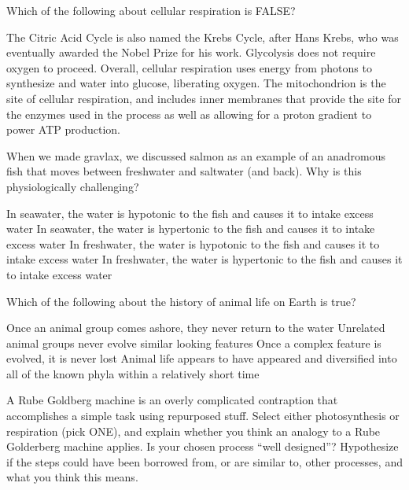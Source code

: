 \documentclass[exam,addpoints,answers]{exam}
\begin{document}
\begin{questions}
\question[1] Which of the following about cellular respiration is FALSE? 
\begin{choices}
\choice The Citric Acid Cycle is also named the Krebs Cycle, after Hans Krebs, who was eventually awarded the Nobel Prize for his work. 
\choice Glycolysis does not require oxygen to proceed. 
\CorrectChoice Overall, cellular respiration uses energy from photons to synthesize  and water into glucose, liberating oxygen. 
\choice The mitochondrion is the site of cellular respiration, and includes inner membranes that provide the site for the enzymes used in the process as well as allowing for a proton gradient to power ATP production. 
\end{choices}




\question[1] When we made gravlax, we discussed salmon as an example of an anadromous fish that moves between freshwater and saltwater (and back). Why is this physiologically challenging? 
\begin{choices}
\choice In seawater, the water is hypotonic to the fish and causes it to intake excess water
\choice In seawater, the water is hypertonic to the fish and causes it to intake excess water
\CorrectChoice In freshwater, the water is hypotonic to the fish and causes it to intake excess water
\choice In freshwater, the water is hypertonic to the fish and causes it to intake excess water
\end{choices}




\question[1] Which of the following about the history of animal life on Earth is true? 
\begin{choices}
\choice Once an animal group comes ashore, they never return to the water
\choice Unrelated animal groups never evolve similar looking features
\choice Once a complex feature is evolved, it is never lost
\CorrectChoice Animal life appears to have appeared and diversified into all of the known phyla within a relatively short time
\end{choices}



\clearpage
\question[22] A Rube Goldberg machine is an overly complicated contraption that accomplishes a simple task using repurposed stuff. Select either photosynthesis or respiration (pick ONE), and explain whether you think an analogy to a Rube Golderberg machine applies. Is your chosen process ``well designed''? Hypothesize if the steps could have been borrowed from, or are similar to, other processes, and what you think this means. 


\end{questions}
\end{document}
